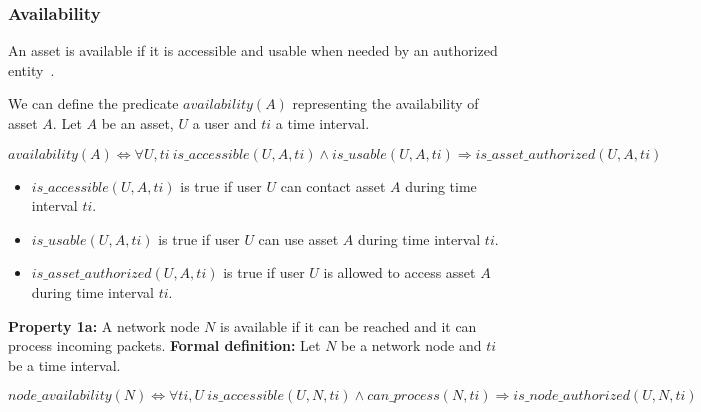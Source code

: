 \subsubsection{Availability}
\label{sec:prop-avail}
An asset is available if it is accessible and usable when
needed by an authorized entity~\cite{ISO/IEC270012013}.

We can define the predicate $availability(A)$ representing the availability of asset $A$.
\newline
Let $A$ be an asset, $U$ a user and $ti$ a time interval.
\newline

\begin{myformula}
$availability(A) \Leftrightarrow \forall U,ti~is\_accessible(U,A,ti) \wedge is\_usable(U,A,ti) \Rightarrow is\_asset\_authorized(U,A,ti)$
\end{myformula}

\begin{itemize}
\item $is\_accessible(U,A,ti)$ is true if user $U$ can contact asset $A$ during time interval $ti$.
\item $is\_usable(U,A,ti)$ is true if user $U$ can use asset $A$ during time interval $ti$.
\item $is\_asset\_authorized(U,A,ti)$ is true if user $U$ is allowed to access asset $A$  during time interval $ti$.
\end{itemize}

\textbf{Property 1a:} A network node $N$ is available if it can be reached and it can process incoming packets.
\newline
\textbf{Formal definition:} Let $N$ be a network node and $ti$ be a time interval.

\begin{myformula}
$node\_availability(N) \Leftrightarrow \forall ti,U~ is\_accessible(U,N,ti) \wedge can\_process(N,ti) \Rightarrow is\_node\_authorized(U,N,ti)$
\end{myformula}

